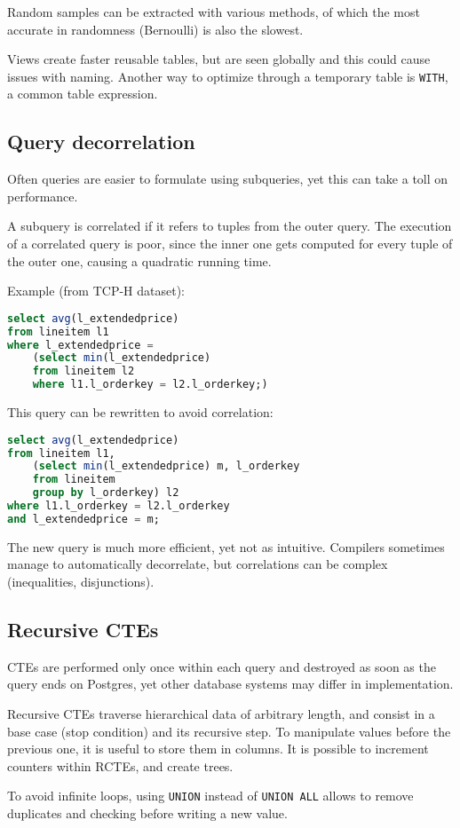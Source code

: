 Random samples can be extracted with various methods, of which the most accurate in randomness (Bernoulli) is also the slowest.

Views create faster reusable tables, but are seen globally and this could cause issues with naming. Another way to optimize through a temporary table is \texttt{WITH}, a common table expression.

\subsection{Query decorrelation}
Often queries are easier to formulate using subqueries, yet this can take a toll on performance.

A subquery is correlated if it refers to tuples from the outer query. The execution of a correlated query is poor, since the inner one gets computed for every tuple of the outer one, causing a quadratic running time.

Example (from TCP-H dataset):
\begin{lstlisting}[language=SQL]
select avg(l_extendedprice)
from lineitem l1
where l_extendedprice =
	(select min(l_extendedprice)
	from lineitem l2
	where l1.l_orderkey = l2.l_orderkey;)
\end{lstlisting}

This query can be rewritten to avoid correlation:
\begin{lstlisting}[language=SQL]
select avg(l_extendedprice)
from lineitem l1,
	(select min(l_extendedprice) m, l_orderkey
	from lineitem
	group by l_orderkey) l2
where l1.l_orderkey = l2.l_orderkey
and l_extendedprice = m;
\end{lstlisting}

The new query is much more efficient, yet not as intuitive. Compilers sometimes manage to automatically decorrelate, but correlations can be complex (inequalities, disjunctions).


\subsection{Recursive CTEs}
CTEs are performed only once within each query and destroyed as soon as the query ends on Postgres, yet other database systems may differ in implementation. 

Recursive CTEs traverse hierarchical data of arbitrary length, and consist in a base case (stop condition) and its recursive step. To manipulate values before the previous one, it is useful to store them in columns. It is possible to increment counters within RCTEs, and create trees. 

To avoid infinite loops, using \texttt{UNION} instead of \texttt{UNION ALL} allows to remove duplicates and checking before writing a new value.
